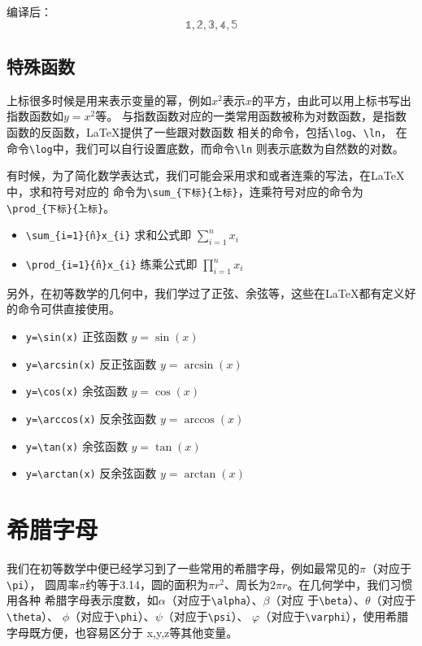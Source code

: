 编译后：
$$\mathbb{1},\mathbb{2},\mathbb{3},\mathbb{4},\mathbb{5}$$

\subsection{特殊函数}
上标很多时候是用来表示变量的幂，例如$x^{2}$表示$x$的平方，由此可以用上标书写出指数函数如$y=x^2$等。
与指数函数对应的一类常用函数被称为对数函数，是指数函数的反函数，LaTeX提供了一些跟对数函数
相关的命令，包括\texttt{\textbackslash{}log}、\texttt{\textbackslash{}ln}，
在命令\texttt{\textbackslash{}log}中，我们可以自行设置底数，而命令\texttt{\textbackslash{}ln}
则表示底数为自然数的对数。

有时候，为了简化数学表达式，我们可能会采用求和或者连乘的写法，在LaTeX中，求和符号对应的
命令为\texttt{\textbackslash{}sum\_\{下标\}\^\{上标\}}，连乘符号对应的命令为
\texttt{\textbackslash{}prod\_\{下标\}\^\{上标\}}。

\begin{itemize}
    \item \texttt{\textbackslash{}sum\_\{i=1\}\^\{n\}x\_\{i\}} 求和公式即 $\sum_{i=1}^{n}x_{i}$
    \item \texttt{\textbackslash{}prod\_\{i=1\}\^\{n\}x\_\{i\}} 练乘公式即 $\prod_{i=1}^{n}x_{i}$
\end{itemize}

另外，在初等数学的几何中，我们学过了正弦、余弦等，这些在LaTeX都有定义好的命令可供直接使用。

\begin{itemize}
    \item \texttt{y=\textbackslash{}sin(x)} 正弦函数 $y=\sin(x)$
    \item \texttt{y=\textbackslash{}arcsin(x)} 反正弦函数 $y=\arcsin(x)$
    \item \texttt{y=\textbackslash{}cos(x)} 余弦函数 $y=\cos(x)$
    \item \texttt{y=\textbackslash{}arccos(x)} 反余弦函数 $y=\arccos(x)$
    \item \texttt{y=\textbackslash{}tan(x)} 余弦函数 $y=\tan(x)$
    \item \texttt{y=\textbackslash{}arctan(x)} 反余弦函数 $y=\arctan(x)$
\end{itemize}

\section{希腊字母}
我们在初等数学中便已经学习到了一些常用的希腊字母，例如最常见的$\pi$（对应于\texttt{\textbackslash{}pi}），
圆周率$\pi$约等于3.14，圆的面积为$\pi r^2$、周长为$2\pi r$。在几何学中，我们习惯用各种
希腊字母表示度数，如$\alpha$（对应于\texttt{\textbackslash{}alpha}）、$\beta$（对应
于\texttt{\textbackslash{}beta}）、$\theta$（对应于\texttt{\textbackslash{}theta}）、
$\phi$（对应于\texttt{\textbackslash{}phi}）、$\psi$（对应于\texttt{\textbackslash{}psi}）、
$\varphi$（对应于\texttt{\textbackslash{}varphi}），使用希腊字母既方便，也容易区分于
x,y,z等其他变量。

